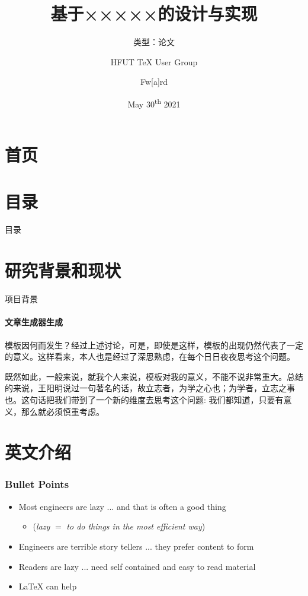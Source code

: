 \documentclass[aspectratio=169]{beamer}
\title{基于×××××的设计与实现}
\subtitle{类型：论文}
\author[{Fw[a]rd}]{HFUT \TeX{} User Group \and Fw[a]rd}
\institute{HFUT \TeX{} User Group}
\date{May 30\textsuperscript{th} 2021}
\begin{document}
\section*{首页}
\begin{frame}
	\maketitle
\end{frame}

\section*{目录}
\begin{frame}{目录}
	\tableofcontents
\end{frame}

\section{研究背景和现状}

\begin{frame}{项目背景}
    \framesubtitle{文章生成器生成}
{
    \setlength{\parskip}{6pt}
    \setlength{\parindent}{2em}
模板因何而发生？经过上述讨论，可是，即使是这样，模板的出现仍然代表了一定的意义。这样看来，本人也是经过了深思熟虑，在每个日日夜夜思考这个问题。

既然如此，一般来说，就我个人来说，模板对我的意义，不能不说非常重大。总结的来说，王阳明说过一句著名的话，故立志者，为学之心也；为学者，立志之事也。这句话把我们带到了一个新的维度去思考这个问题: 我们都知道，只要有意义，那么就必须慎重考虑。 
}
\end{frame}

\section{英文介绍}
\begin{frame}
\frametitle{Bullet Points}
\vspace{-0.3cm}
\begin{itemize}[<+->]
	\item Most engineers are lazy ... and that is often a good thing
	\begin{itemize}[<+->]
		\item (\textit{lazy} $=$ \textit{to do things in the most efficient way})
	\end{itemize}
	\item Engineers are terrible story tellers ... they prefer content to form
	\item Readers are lazy ... need self contained and easy to read material
	\item \LaTeX{} can help
\end{itemize}
\end{frame}
\end{document}
